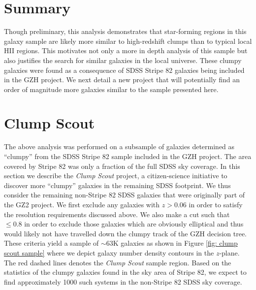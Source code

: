\section{Summary}


Though preliminary, this analysis demonstrates that star-forming regions in this galaxy sample are likely more similar to high-redshift clumps than to typical local HII regions. This motivates not only a more in depth analysis of this sample but also justifies the search for similar galaxies in the local universe. These clumpy galaxies were found as a consequence of SDSS Stripe 82 galaxies being included in the GZH project. We next detail a new project that will potentially find an order of magnitude more galaxies similar to the sample presented here.


\section{Clump Scout}
The above analysis was performed on a subsample of galaxies determined as ``clumpy'' from the SDSS Stripe 82 sample included in the GZH project. The area covered by Stripe 82 was only a fraction of the full SDSS sky coverage. In this section we describe the \textit{Clump Scout} project, a citizen-science initiative to discover more ``clumpy'' galaxies in the remaining SDSS footprint. We thus consider the remaining non-Stripe 82 SDSS galaxies that were originally part of the GZ2 project. We first exclude any galaxies with $z>0.06$ in order to satisfy the resolution requirements discussed above. We also make a cut such that \fsmooth~$\le0.8$ in order to exclude those galaxies which are obviously elliptical and thus would likely not have travelled down the clumpy track of the GZH decision tree. These criteria yield a sample of $\sim63$K galaxies as shown in Figure \ref{fig: clump scout sample} where we depict galaxy number density contours in the $z$-\fsmooth plane. The red dashed lines denotes the \textit{Clump Scout} sample region. Based on the statistics of the clumpy galaxies found in the sky area of Stripe 82, we expect to find approximately 1000 such systems in the non-Stripe 82 SDSS sky coverage.

